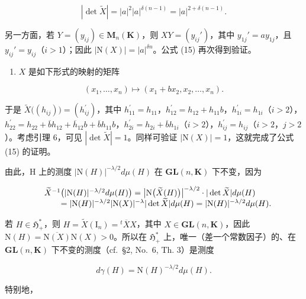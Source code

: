 \[
| \det \widetilde {X} | = | a | ^ {2} | a | ^ {\delta (n - 1)} = | a | ^ {2 + \delta (n - 1)}.
\]

另一方面，若 \(Y = (y_{ij}) \in \mathbf{M}_n(\mathbf{K})\)，则 \(XY = (y_{ij}')\)，其中 \(y_{1j}' = ay_{1j}\)，且 \(y_{ij}' = y_{ij}\)（\(i > 1\)）；因此 \(|\mathrm{N}(X)| = |a|^{\delta n}\)。公式 (15) 再次得到验证。

\begin{enumerate}
\def\labelenumi{\alph{enumi})}
\setcounter{enumi}{2}
\tightlist
\item
  \(X\) 是如下形式的映射的矩阵
\end{enumerate}

\[
\left(x _ {1}, \dots , x _ {n}\right) \mapsto \left(x _ {1} + b x _ {2}, x _ {2}, \dots , x _ {n}\right).
\]

于是 \(\widetilde{X}\big((h_{ij})\big) = (h_{ij}^{\prime})\)，其中 \(h_{11}^{\prime} = h_{11}\)，\(h_{12}^{\prime} = h_{12} + h_{11}b\)，\(h_{1i}^{\prime} = h_{1i}\)（\(i > 2\)），\(h_{22}^{\prime} = h_{22} + \overline{b}h_{12} + \overline{h}_{12}b + \overline{b}h_{11}b\)，\(h_{2i}^{\prime} = h_{2i} + \overline{b}h_{1i}\)（\(i > 2\)），\(h_{ij}^{\prime} = h_{ij}\)（\(i > 2\)，\(j > 2\)）。考虑引理 6，可见 \(|\det \widetilde{X}| = 1\)。同样可验证 \(|\mathrm{N}(X)| = 1\)，这就完成了公式 (15) 的证明。

由此，H 上的测度 \(|\mathrm{N}(H)|^{-\lambda/2}d\mu(H)\) 在 \(\mathbf{GL}(n,\mathbf{K})\) 下不变，因为

\[
\begin{array}{r l} & {\widetilde {X} ^ {- 1} \big (| \mathrm{N} (H) | ^ {- \lambda / 2} d \mu (H) \big) = \big | \mathrm{N} \big (\widetilde {X} (H) \big) \big | ^ {- \lambda / 2} \cdot | \det \widetilde {X} | d \mu (H)} \\ & {\qquad = | \mathrm{N} (H) | ^ {- \lambda / 2} | \mathrm{N} (X) | ^ {- \lambda} | \det \widetilde {X} | d \mu (H) = | \mathrm{N} (H) | ^ {- \lambda / 2} d \mu (H).} \end{array}
\]

若 \(H \in \mathfrak{H}_+^*\)，则 \(H = \widetilde{X}(\mathrm{I}_n) = {}^t\overline{X}X\)，其中 \(X \in \mathbf{GL}(n,\mathbf{K})\)，因此 \(\mathrm{N}(H) = \overline{\mathrm{N}(X)}\mathrm{N}(X) > 0\)。所以在 \(\mathfrak{H}_+^*\) 上，唯一（差一个常数因子）的、在 \(\mathbf{GL}(n,\mathbf{K})\) 下不变的测度（cf.~§2, No.~6, Th. 3）是测度

\[
d \gamma (H) = \mathrm{N} (H) ^ {- \lambda / 2} d \mu (H).
\]

特别地，

